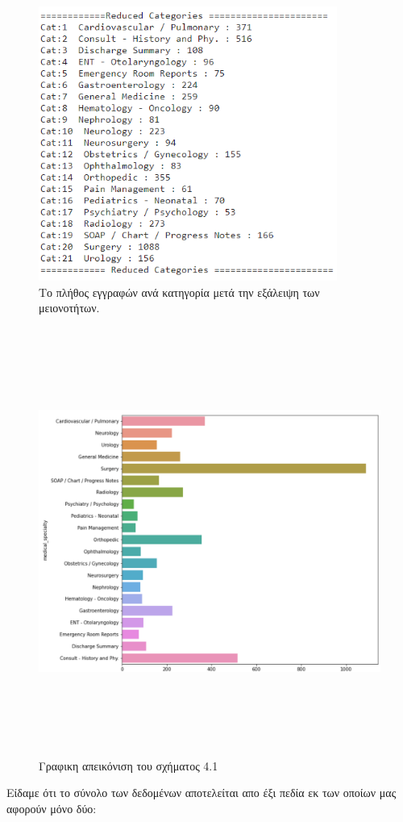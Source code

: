 \begin{figure}\centering
\includegraphics[width=\textwidth,height=9cm,keepaspectratio]{pictures/3reducedCategories.png} \caption{Το πλήθος εγγραφών ανά κατηγορία μετά την εξάλειψη των μειονοτήτων.}\label{figure4.1}
\end{figure}

\begin{figure}\centering
\includegraphics[width=\textwidth,height=14cm,keepaspectratio]{pictures/3categoriesPlot.png} \caption{Γραφικη απεικόνιση του σχήματος 4.1}\label{figure4.2}
\end{figure}
\clearpage
Είδαμε ότι το σύνολο των δεδομένων αποτελείται απο έξι πεδία εκ των οποίων μας αφορούν μόνο δύο:

